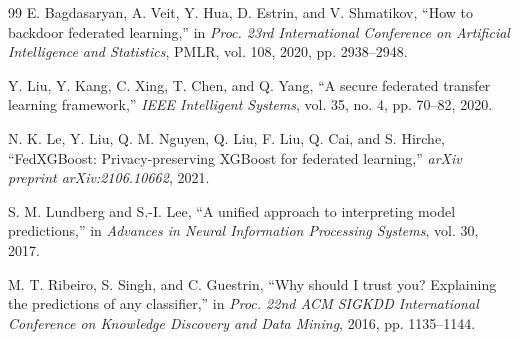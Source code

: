 \begin{thebibliography}{99}
E. Bagdasaryan, A. Veit, Y. Hua, D. Estrin, and V. Shmatikov, ``How to backdoor federated learning,'' in \textit{Proc. 23rd International Conference on Artificial Intelligence and Statistics}, PMLR, vol. 108, 2020, pp. 2938--2948.

Y. Liu, Y. Kang, C. Xing, T. Chen, and Q. Yang, ``A secure federated transfer learning framework,'' \textit{IEEE Intelligent Systems}, vol. 35, no. 4, pp. 70--82, 2020.

N. K. Le, Y. Liu, Q. M. Nguyen, Q. Liu, F. Liu, Q. Cai, and S. Hirche, ``FedXGBoost: Privacy-preserving XGBoost for federated learning,'' \textit{arXiv preprint arXiv:2106.10662}, 2021.

S. M. Lundberg and S.-I. Lee, ``A unified approach to interpreting model predictions,'' in \textit{Advances in Neural Information Processing Systems}, vol. 30, 2017.

M. T. Ribeiro, S. Singh, and C. Guestrin, ``Why should I trust you? Explaining the predictions of any classifier,'' in \textit{Proc. 22nd ACM SIGKDD International Conference on Knowledge Discovery and Data Mining}, 2016, pp. 1135--1144.

\end{thebibliography}
